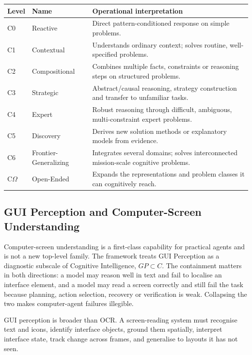 \documentclass[11pt]{article}
\theoremstyle{definition}
\newcommand{\Om}{\ensuremath{\Omega}}
\begin{document}
\begin{table}[h]
\centering\small
\begin{tabularx}{\textwidth}{@{}llY@{}}
\toprule
Level & Name & Operational interpretation \\
\midrule
C0 & Reactive & Direct pattern-conditioned response on simple problems. \\
C1 & Contextual & Understands ordinary context; solves routine, well-specified problems. \\
C2 & Compositional & Combines multiple facts, constraints or reasoning steps on structured problems. \\
C3 & Strategic & Abstract/causal reasoning, strategy construction and transfer to unfamiliar tasks. \\
C4 & Expert & Robust reasoning through difficult, ambiguous, multi-constraint expert problems. \\
C5 & Discovery & Derives new solution methods or explanatory models from evidence. \\
C6 & Frontier-Generalizing & Integrates several domains; solves interconnected mission-scale cognitive problems. \\
C\Om{} & Open-Ended & Expands the representations and problem classes it can cognitively reach. \\
\bottomrule
\end{tabularx}
\end{table}

\subsection{GUI Perception and Computer-Screen Understanding}\label{sec:gp}

Computer-screen understanding is a first-class capability for practical agents and is not a new top-level family. The framework treats GUI Perception as a diagnostic subscale of Cognitive Intelligence, $GP \subset C$. The containment matters in both directions: a model may reason well in text and fail to localise an interface element, and a model may read a screen correctly and still fail the task because planning, action selection, recovery or verification is weak. Collapsing the two makes computer-agent failures illegible.

GUI perception is broader than OCR. A screen-reading system must recognise text and icons, identify interface objects, ground them spatially, interpret interface state, track change across frames, and generalise to layouts it has not seen.
\end{document}
